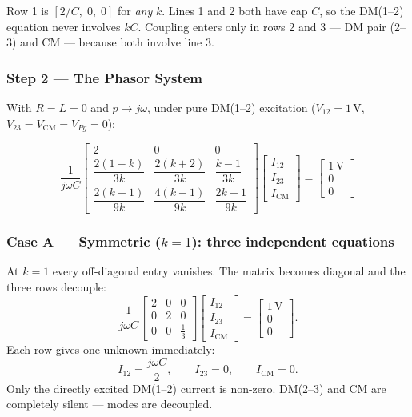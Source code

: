 \begin{statebox}
Row 1 is $[2/C,\;0,\;0]$ for \emph{any} $k$.  Lines 1 and 2 both
have cap $C$, so the DM(1--2) equation never involves $kC$.
Coupling enters only in rows 2 and 3 — DM pair (2--3) and CM —
because both involve line 3.
\end{statebox}

\subsubsection*{Step 2 — The Phasor System}

With $R = L = 0$ and $p \to j\omega$, under pure DM(1--2) excitation
($V_{12} = 1\,\text{V}$, $V_{23} = V_{\mathrm{CM}} = V_{Pg} = 0$):

\begin{eqnbox}[$N = 3$ Phasor System Under DM(1--2) Excitation Only]
\begin{equation}
\frac{1}{j\omega C}
\begin{bmatrix}
    2 & 0 & 0 \\[8pt]
    \dfrac{2(1-k)}{3k} & \dfrac{2(k+2)}{3k} & \dfrac{k-1}{3k} \\[12pt]
    \dfrac{2(k-1)}{9k} & \dfrac{4(k-1)}{9k} & \dfrac{2k+1}{9k}
\end{bmatrix}
\begin{bmatrix} I_{12} \\[4pt] I_{23} \\[4pt] I_{\mathrm{CM}} \end{bmatrix}
=
\begin{bmatrix} 1\,\mathrm{V} \\[4pt] 0 \\[4pt] 0 \end{bmatrix}
\label{eq:num_sys_N3}
\end{equation}
\end{eqnbox}

\subsubsection*{Case A — Symmetric ($k = 1$): three independent equations}

At $k = 1$ every off-diagonal entry vanishes.  The matrix becomes
diagonal and the three rows decouple:
\[
\frac{1}{j\omega C}
\begin{bmatrix} 2 & 0 & 0 \\ 0 & 2 & 0 \\ 0 & 0 & \tfrac{1}{3} \end{bmatrix}
\begin{bmatrix} I_{12} \\ I_{23} \\ I_{\mathrm{CM}} \end{bmatrix}
=
\begin{bmatrix} 1\,\mathrm{V} \\ 0 \\ 0 \end{bmatrix}.
\]
Each row gives one unknown immediately:
\[
    I_{12} = \frac{j\omega C}{2}, \qquad I_{23} = 0, \qquad
    \boxed{I_{\mathrm{CM}} = 0.}
\]
Only the directly excited DM(1--2) current is non-zero.  DM(2--3)
and CM are completely silent — modes are decoupled.

